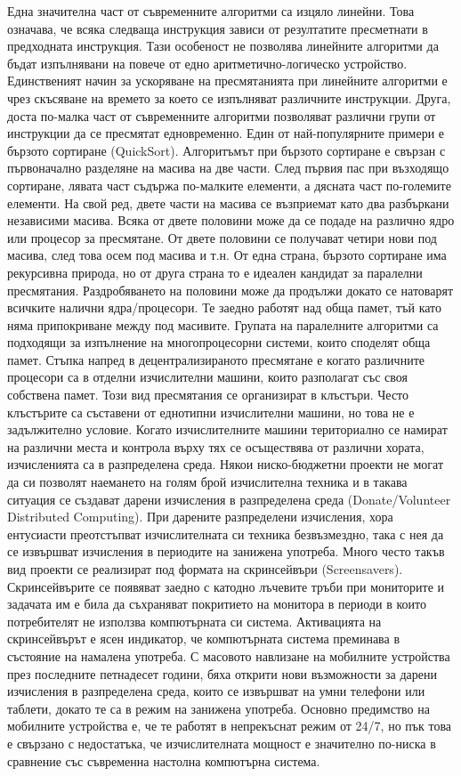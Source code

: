 Една значителна част от съвременните алгоритми са изцяло линейни. Това означава, че всяка следваща инструкция зависи от резултатите пресметнати в предходната инструкция. Тази особеност не позволява линейните алгоритми да бъдат изпълнявани на повече от едно аритметично-логическо устройство. Единственият начин за ускоряване на пресмятанията при линейните алгоритми е чрез скъсяване на времето за което се изпълняват различните инструкции. Друга, доста по-малка част от съвременните алгоритми позволяват различни групи от инструкции да се пресмятат едновременно. Един от най-популярните примери е бързото сортиране (QuickSort). Алгоритъмът при бързото сортиране е свързан с първоначално разделяне на масива на две части. След първия пас при възходящо сортиране, лявата част съдържа по-малките елементи, а дясната част по-големите елементи. На свой ред, двете части на масива се възприемат като два разбъркани независими масива. Всяка от двете половини може да се подаде на различно ядро или процесор за пресмятане. От двете половини се получават четири нови под масива, след това осем под масива и т.н. От една страна, бързото сортиране има рекурсивна природа, но от друга страна то е идеален кандидат за паралелни пресмятания. Раздробяването на половини може да продължи докато се натоварят всичките налични ядра/процесори. Те заедно работят над обща памет, тъй като няма припокриване между под масивите. Групата на паралелните алгоритми са подходящи за изпълнение на многопроцесорни системи, които споделят обща памет. Стъпка напред в децентрализираното пресмятане е когато различните процесори са в отделни изчислителни машини, които разполагат със своя собствена памет. Този вид пресмятания се организират в клъстъри. Често клъстърите са съставени от еднотипни изчислителни машини, но това не е задължително условие. Когато изчислителните машини териториално се намират на различни места и контрола върху тях се осъществява от различни хората, изчисленията са в разпределена среда. Някои ниско-бюджетни проекти не могат да си позволят наемането на голям брой изчислителна техника и в такава ситуация се създават дарени изчисления в разпределена среда (Donate/Volunteer Distributed Computing). При дарените разпределени изчисления, хора ентусиасти преотстъпват изчислителната си техника безвъзмездно, така с нея да се извършват изчисления в периодите на занижена употреба. Много често такъв вид проекти се реализират под формата на скринсейвъри (Screensavers). Скринсейвърите се появяват заедно с катодно лъчевите тръби при мониторите и задачата им е била да съхраняват покритието на монитора в периоди в които потребителят не използва компютърната си система. Активацията на скринсейвърът е ясен индикатор, че компютърната система преминава в състояние на намалена употреба. С масовото навлизане на мобилните устройства през последните петнадесет години, бяха открити нови възможности за дарени изчисления в разпределена среда, които се извършват на умни телефони или таблети, докато те са в режим на занижена употреба. Основно предимство на мобилните устройства е, че те работят в непрекъснат режим от 24/7, но пък това е свързано с недостатъка, че изчислителната мощност е значително по-ниска в сравнение със съвременна настолна компютърна система. 

